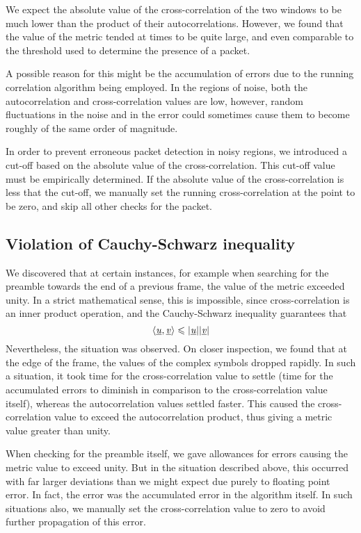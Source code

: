 We expect the absolute value of the cross-correlation of the two windows to be
much lower than the product of their autocorrelations. However, we found that
the value of the metric tended at times to be quite large, and even comparable
to the threshold used to determine the presence of a packet.

A possible reason for this might be the accumulation of errors due to the
running correlation algorithm being employed. In the regions of noise, both the
autocorrelation and cross-correlation values are low, however, random
fluctuations in the noise and in the error could sometimes cause them to become
roughly of the same order of magnitude.

In order to prevent erroneous packet detection in noisy regions, we introduced
a cut-off based on the absolute value of the cross-correlation. This cut-off
value must be empirically determined. If the absolute value of the
cross-correlation is less that the cut-off, we manually set the running
cross-correlation at the point to be zero, and skip all other checks for the
packet.


\subsection{Violation of Cauchy-Schwarz inequality}
\label{subsec:cs-violation}

We discovered that at certain instances, for example when searching for the
preamble towards the end of a previous frame, the value of the metric exceeded
unity. In a strict mathematical sense, this is impossible, since
cross-correlation is an inner product operation, and the Cauchy-Schwarz
inequality guarantees that
$$ \langle \underbar{\emph{u}}, \underbar{\emph{v}} \rangle \leqslant |\underbar{\emph{u}}||\underbar{\emph{v}}| $$
Nevertheless, the situation was observed. On closer inspection, we found that
at the edge of the frame, the values of the complex symbols dropped rapidly. In
such a situation, it took time for the cross-correlation value to settle (time
for the accumulated errors to diminish in comparison to the cross-correlation
value itself), whereas the autocorrelation values settled faster. This caused
the cross-correlation value to exceed the autocorrelation product, thus giving
a metric value greater than unity.

When checking for the preamble itself, we gave allowances for errors causing
the metric value to exceed unity. But in the situation described above, this
occurred with far larger deviations than we might expect due purely to floating
point error. In fact, the error was the accumulated error in the algorithm
itself. In such situations also, we manually set the cross-correlation value to
zero to avoid further propagation of this error.

